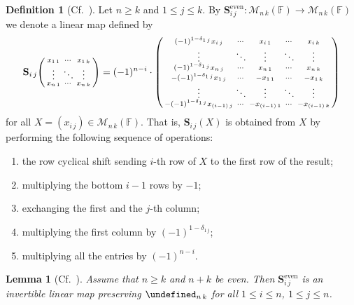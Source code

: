 \documentclass{elsarticle}
\let\det\undefined
\DeclareMathOperator{\det}{det}
\def\F{{\mathbb F}}
\def\M{{\mathcal M}}
\def\SCS{{\mathbf S}}
\newenvironment{psmallmatrix}
  {\left(\begin{smallmatrix}}
  {\end{smallmatrix}\right)}
\newtheorem{lemma}[theorem]{Lemma}
\theoremstyle{definition}
\newtheorem{definition}[theorem]{Definition}
\numberwithin{equation}{section}
\begin{document}
\begin{definition}[{Cf.~\cite[Definition~4.3]{Guterman2025}}]\label{def:SCSDefEven}Let $n \ge k$ and  $1 \le j \le k$. By $\SCS^{\mathrm{even}}_{i\,j} \colon \M_{n\,k}(\F) \to \M_{n\,k}(\F)$ we denote a linear map defined by
\begin{equation*}
\SCS_{i\,j}\begin{psmallmatrix}
x_{1\,1} & \cdots  & x_{1\,k}\\
  \vdots & \ddots & \vdots\\
x_{n\,1} & \cdots & x_{n\,k}\\
\end{psmallmatrix} =(-1)^{n-i}\cdot  
\begin{psmallmatrix}
(-1)^{1 - \delta_{1\,j}}x_{i\,j} & \cdots & x_{i\,1} & \cdots & x_{i\,k}\\
\vdots & \ddots & \vdots & \ddots & \vdots\\
(-1)^{1 - \delta_{1\,j}}x_{n\,j} & \cdots & x_{n\,1} & \cdots & x_{n\,k}\\
-(-1)^{1 - \delta_{1\,j}}x_{1\,j} & \cdots & -x_{1\,1} & \cdots & -x_{1\,k}\\
  \vdots & \ddots & \vdots & \ddots & \vdots\\
-(-1)^{1 - \delta_{1\,j}}x_{(i-1)\,j} & \cdots & -x_{(i-1)\,1} & \cdots &  -x_{(i-1)\,k}\\
\end{psmallmatrix}
\end{equation*}
for all $X = (x_{i\,j}) \in \M_{n\,k}(\F)$. That is, $\SCS_{i\,j}(X)$ is obtained from $X$ by performing the following sequence of operations:
\begin{enumerate}
\item the row cyclical shift sending $i$-th row of $X$ to the first row of the result;
\item multiplying the bottom $i-1$ rows by $-1$;
\item exchanging the first and the $j$-th column;
\item multiplying the first column  by $(-1)^{1 - \delta_{1\,j}}$;
\item multiplying all the entries by $(-1)^{n-i}$.
\end{enumerate}
\end{definition}



\begin{lemma}[{Cf.~\cite[Lemma~4.5]{Guterman2025}}]\label{lem:ReduceTo11ByShift}Assume that $n \ge k$ and $n + k$ be even. Then $\SCS^{\mathrm{even}}_{i\,j}$ is an invertible linear map preserving $\det_{n\,k}$ for all $1 \le i \le n$, $1 \le j \le n$.
\end{lemma}
\end{document}

